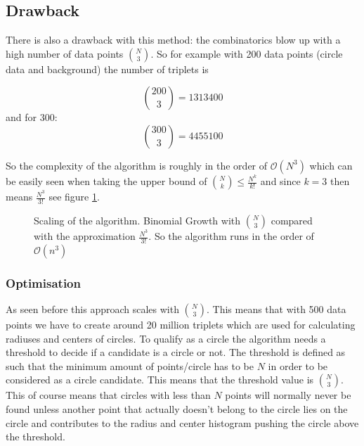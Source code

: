 \documentclass[11pt,twoside]{scrreprt}
\begin{document}
\subsection{Drawback}
	

There is also a drawback with this method: the combinatorics blow up with a high number of data points \( \binom{N}{3} \). So for example with 200 data points (circle data and background) the number of triplets is

\[ \binom{200}{3} = 1313400 \]
and for 300:
\[ \binom{300}{3} = 4455100 \]

So the complexity of the algorithm is roughly in the order of $\mathcal{O}(N^3)$ which can be easily seen when taking the upper bound of $\binom{N}{k} \leq \frac{N^k}{k!}$ and since $k=3$ then means $\frac{N^3}{3!}$ see figure \ref{fig:binom_growth}. 
\begin{figure}[ht]
\centering
    \caption[Complexity of the combinatorial triplet Hough transform]{Scaling of the algorithm. Binomial Growth with $\binom{N}{3}$ compared with the approximation $\frac{N^3}{3!}$. So the algorithm runs in the order of $\mathcal{O}(n^3)$}
  \label{fig:binom_growth}
\end{figure}


\subsubsection{Optimisation} %
\label{ssub:improvement_of_speed}

As seen before this approach scales with $\binom{N}{3}$. This means that with 500 data points we have to create around 20 million triplets which are used for calculating radiuses and centers of circles. 
To qualify as a circle the algorithm needs a threshold to decide if a candidate is a circle or not. The threshold is defined as such that the minimum amount of points/circle has to be $N$ in order to be considered as a circle candidate. This means that the threshold value is $\binom{N}{3}$. This of course means that circles with less than $N$ points will normally never be found unless another point that actually doesn't belong to the circle lies on the circle and contributes to the radius and center histogram pushing the circle above the threshold.
\end{document}
